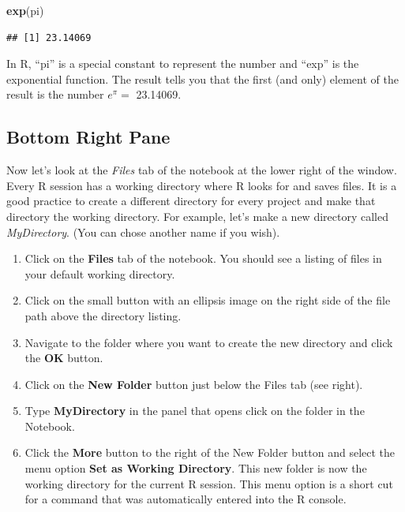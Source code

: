 \documentclass[
]{book}
\newenvironment{Shaded}{\begin{snugshade}}{\end{snugshade}}
\newcommand{\KeywordTok}[1]{\textcolor[rgb]{0.13,0.29,0.53}{\textbf{#1}}}
\newcommand{\NormalTok}[1]{#1}
\begin{document}
\begin{Shaded}
\begin{Highlighting}[]
\KeywordTok{exp}\NormalTok{(pi)}
\end{Highlighting}
\end{Shaded}

\begin{verbatim}
## [1] 23.14069
\end{verbatim}

In R, ``pi'' is a special constant to represent the number and ``exp'' is the exponential function. The result tells you that the first (and only) element of the result is the number \(e^{\pi}=\) 23.14069.

\hypertarget{bottom-right-pane}{%
\subsection*{Bottom Right Pane}\label{bottom-right-pane}}

Now let's look at the \emph{Files} tab of the notebook at the lower right of the window. Every R session has a working directory where R looks for and saves files. It is a good practice to create a different directory for every project and make that directory the working directory. For example, let's make a new directory called \emph{MyDirectory}. (You can chose another name if you wish).

\begin{enumerate}
\def\labelenumi{\arabic{enumi})}
\item
  Click on the \textbf{Files} tab of the notebook. You should see a listing of files in your default working directory.
\item
  Click on the small button with an ellipsis image on the right side of the file path above the directory listing.
\item
  Navigate to the folder where you want to create the new directory and click the \textbf{OK} button.
\item
  Click on the \textbf{New Folder} button just below the Files tab (see right).
\item
  Type \textbf{MyDirectory} in the panel that opens click on the folder in the Notebook.
\item
  Click the \textbf{More} button to the right of the New Folder button and select the menu option \textbf{Set as Working Directory}. This new folder is now the working directory for the current R session. This menu option is a short cut for a command that was automatically entered into the R console.
\end{enumerate}
\end{document}
